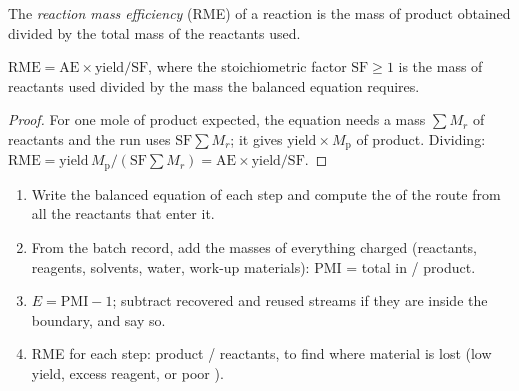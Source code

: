\begin{definition}\label{def:b3:green-industrial:rme}
The \emph{reaction mass efficiency} (RME) of a
reaction is the mass of product obtained divided by the total mass of the
reactants used.
\end{definition}

\begin{proposition}\label{prop:b3:green-industrial:rme}
$\mathrm{RME} = \mathrm{AE} \times \text{yield}/\mathrm{SF}$, where the stoichiometric factor $\mathrm{SF} \ge 1$ is the mass of
reactants used divided by the mass the balanced equation requires.
\end{proposition}

\begin{proof}
For one mole of product expected, the equation needs a mass $\sum M_r$ of reactants and
the run uses $\mathrm{SF}\sum M_r$; it gives $\text{yield} \times M_{\mathrm p}$ of product. Dividing:
$\mathrm{RME} = \text{yield}\,M_{\mathrm p}/(\mathrm{SF}\sum M_r) = \mathrm{AE} \times \text{yield}/\mathrm{SF}$.
\end{proof}

\begin{method}\label{met:b3:green-industrial:metrics}
\begin{enumerate}
  \item Write the balanced equation of each step and compute the  of the
        route from all the reactants that enter it.
  \item From the batch record, add the masses of everything charged (reactants,
        reagents, solvents, water, work-up materials): PMI = total in / product.
  \item $E = \mathrm{PMI} - 1$; subtract recovered and reused streams if they are inside the
        boundary, and say so.
  \item RME for each step: product / reactants, to find where material is lost
        (low yield, excess reagent, or poor ).
\end{enumerate}
\end{method}

